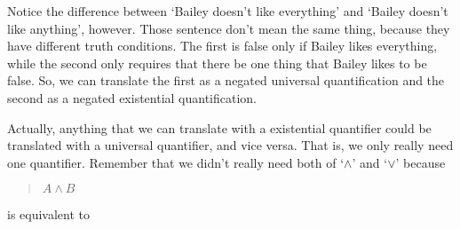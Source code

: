 \documentclass[../logic-text.tex]{subfiles}
\begin{document}
Notice the difference between \enquote*{Bailey doesn't like everything} and \enquote*{Bailey doesn't like anything}, however. Those sentence don't mean the same thing, because they have different truth conditions. The first is false only if Bailey likes everything, while the second only requires that there be one thing that Bailey likes to be false. So, we can translate the first as a negated universal quantification and the second as a negated existential quantification.

Actually, anything that we can translate with a existential quantifier could be translated with a universal quantifier, and vice versa. That is, we only really need one quantifier. Remember that we didn't really need both of \enquote*{\(\land\)} and \enquote*{\(\lor\)} because

\begin{quote}
  \(A \land B\)
\end{quote}

\noindent is equivalent to


\end{document}

